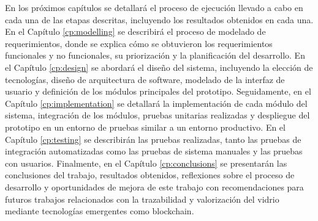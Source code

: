 En los próximos capítulos se detallará el proceso de ejecución llevado a cabo en cada una de las etapas descritas, incluyendo los resultados obtenidos en cada una.
En el Capítulo \ref{cp:modelling} se describirá el proceso de modelado de requerimientos, donde se explica cómo se obtuvieron los requerimientos funcionales y no funcionales, su priorización y la planificación del desarrollo.
En el Capítulo \ref{cp:design} se abordará el diseño del sistema, incluyendo la elección de tecnologías, diseño de arquitectura de software, modelado de la interfaz de usuario y definición de los módulos principales del prototipo.
Seguidamente, en el Capítulo \ref{cp:implementation} se detallará la implementación de cada módulo del sistema, integración de los módulos, pruebas unitarias realizadas y despliegue del prototipo en un entorno de pruebas similar a un entorno productivo.
En el Capítulo \ref{cp:testing} se describirán las pruebas realizadas, tanto las pruebas de integración automatizadas como las pruebas de sistema manuales y las pruebas con usuarios.
Finalmente, en el Capítulo \ref{cp:conclusions} se presentarán las conclusiones del trabajo, resultados obtenidos, reflexiones sobre el proceso de desarrollo y oportunidades de mejora de este trabajo con recomendaciones para futuros trabajos relacionados con la trazabilidad y valorización del vidrio mediante tecnologías emergentes como blockchain.

